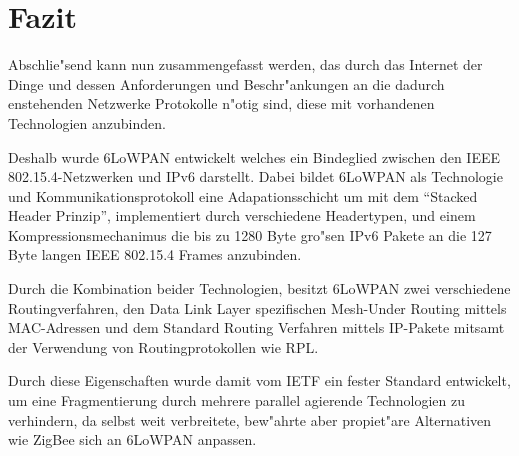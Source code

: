 \documentclass[final]{lktseminar}
\begin{document}
\section{Fazit}
\label{sec:Fazit}
Abschlie"send kann nun zusammengefasst werden, das durch das Internet der Dinge
und dessen Anforderungen und Beschr"ankungen an die dadurch enstehenden Netzwerke
Protokolle n"otig sind, diese mit vorhandenen Technologien anzubinden.

Deshalb wurde 6LoWPAN entwickelt welches ein Bindeglied zwischen den
IEEE 802.15.4-Netzwerken und IPv6 darstellt. Dabei bildet 6LoWPAN als
Technologie und Kommunikationsprotokoll eine Adapationsschicht um mit dem
``Stacked Header Prinzip'', implementiert durch verschiedene Headertypen, und
einem Kompressionsmechanimus die bis zu 1280 Byte gro"sen IPv6 Pakete an die
127 Byte langen IEEE 802.15.4 Frames anzubinden.

Durch die Kombination beider Technologien, besitzt 6LoWPAN zwei verschiedene
Routingverfahren, den Data Link Layer spezifischen Mesh-Under Routing mittels
MAC-Adressen und dem Standard Routing Verfahren mittels IP-Pakete mitsamt der
Verwendung von Routingprotokollen wie RPL.

Durch diese Eigenschaften wurde damit vom IETF ein fester Standard entwickelt,
um eine Fragmentierung durch mehrere parallel agierende Technologien zu verhindern,
da selbst weit verbreitete, bew"ahrte aber propiet"are Alternativen wie ZigBee
sich an 6LoWPAN anpassen.




\newpage
\printbibliography
\end{document}
